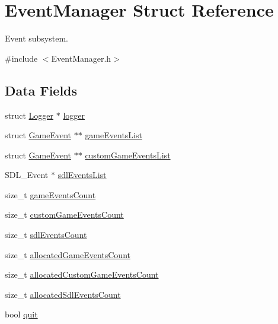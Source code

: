 \hypertarget{struct_event_manager}{}\section{Event\+Manager Struct Reference}
\label{struct_event_manager}


Event subsystem.  




{\ttfamily \#include $<$Event\+Manager.\+h$>$}

\subsection*{Data Fields}
\begin{DoxyCompactItemize}
\item 
struct \hyperlink{struct_logger}{Logger} $\ast$ \hyperlink{struct_event_manager_af4d650f26e6e1a4b53c751abc1eff45e}{logger}
\item 
struct \hyperlink{struct_game_event}{Game\+Event} $\ast$$\ast$ \hyperlink{struct_event_manager_aa2b0ad79c0a87b310b5adf8feaf9ffd4}{game\+Events\+List}
\item 
struct \hyperlink{struct_game_event}{Game\+Event} $\ast$$\ast$ \hyperlink{struct_event_manager_a72dc8ad68e1875aed6c94372ff3a51ce}{custom\+Game\+Events\+List}
\item 
S\+D\+L\+\_\+\+Event $\ast$ \hyperlink{struct_event_manager_ac563054d2cefbd8d20b1daf70eb35d78}{sdl\+Events\+List}
\item 
size\+\_\+t \hyperlink{struct_event_manager_ae586848fac4574f9c630a1b66a3b8c6c}{game\+Events\+Count}
\item 
size\+\_\+t \hyperlink{struct_event_manager_a44bc521b94d679d4a5566cd59866c259}{custom\+Game\+Events\+Count}
\item 
size\+\_\+t \hyperlink{struct_event_manager_a2ef8242634939408c466f0f3f221b1cb}{sdl\+Events\+Count}
\item 
size\+\_\+t \hyperlink{struct_event_manager_a621a8cfb46dee22293a680cf51bc01e4}{allocated\+Game\+Events\+Count}
\item 
size\+\_\+t \hyperlink{struct_event_manager_a274ca9e47ebe07804dc743b3cd3db162}{allocated\+Custom\+Game\+Events\+Count}
\item 
size\+\_\+t \hyperlink{struct_event_manager_a94a2584717ebaf6d143148d5c8b5bf7e}{allocated\+Sdl\+Events\+Count}
\item 
bool \hyperlink{struct_event_manager_ac746fa6ad48d19984a159f14bec028a3}{quit}
\end{DoxyCompactItemize}


